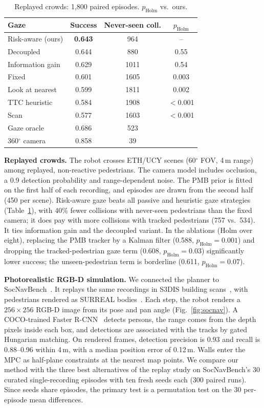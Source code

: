 \documentclass[conference]{IEEEtran}
\begin{document}
\begin{table}[t]
\centering
\caption{Replayed crowds: 1,800 paired episodes. $p_\text{Holm}$ vs.\ ours.}
\label{tab:replay}
\footnotesize
\begin{tabular}{lccc}
\toprule
Gaze & Success & Never-seen coll. & $p_\text{Holm}$ \\
\midrule
Risk-aware (ours)  & \textbf{0.643} & 964  & -- \\
Decoupled          & 0.644 & 880  & 0.55 \\
Information gain   & 0.629 & 1011 & 0.54 \\
Fixed              & 0.601 & 1605 & 0.003 \\
Look at nearest    & 0.599 & 1811 & 0.002 \\
TTC heuristic      & 0.584 & 1908 & $<$0.001 \\
Scan               & 0.577 & 1603 & $<$0.001 \\
\midrule
Gaze oracle        & 0.686 & 523  & \\
360$^\circ$ camera & 0.858 & 39   & \\
\bottomrule
\end{tabular}
\vspace{-3mm}
\end{table}

\textbf{Replayed crowds.} The robot crosses ETH/UCY scenes (60$^\circ$ FOV, 4\,m range) among replayed, non-reactive pedestrians. The camera model includes occlusion, a 0.9 detection probability and range-dependent noise. The PMB prior is fitted on the first half of each recording, and episodes are drawn from the second half (450 per scene). Risk-aware gaze beats all passive and heuristic gaze strategies (Table~\ref{tab:replay}), with 40\% fewer collisions with never-seen pedestrians than the fixed camera; it does pay with more collisions with tracked pedestrians (757 vs.\ 534). It ties information gain and the decoupled variant. In the ablations (Holm over eight), replacing the PMB tracker by a Kalman filter (0.588, $p_\text{Holm}{=}0.001$) and dropping the tracked-pedestrian gaze term (0.608, $p_\text{Holm}{=}0.03$) significantly lower success; the unseen-pedestrian term is borderline (0.611, $p_\text{Holm}{=}0.07$).

\textbf{Photorealistic RGB-D simulation.} We connected the planner to SocNavBench~\cite{socnavbench}. It replays the same recordings in S3DIS building scans~\cite{armeni2016}, with pedestrians rendered as SURREAL bodies~\cite{varol2017}. Each step, the robot renders a $256{\times}256$ RGB-D image from its pose and pan angle (Fig.~\ref{fig:socnav}). A COCO-trained Faster R-CNN~\cite{ren2015} detects persons, the range comes from the depth pixels inside each box, and detections are associated with the tracks by gated Hungarian matching. On rendered frames, detection precision is 0.93 and recall is 0.88--0.96 within 4\,m, with a median position error of 0.12\,m. Walls enter the MPC as half-plane constraints at the nearest map points. We compare our method with the three best alternatives of the replay study on SocNavBench's 30 curated single-recording episodes with ten fresh seeds each (300 paired runs). Since seeds share episodes, the primary test is a permutation test on the 30 per-episode mean differences.
\end{document}
